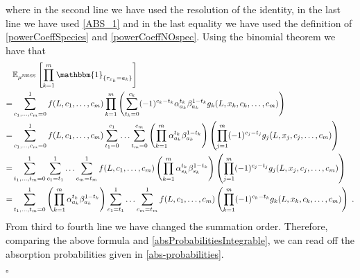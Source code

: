 \documentclass[10pt]{article}
\numberwithin{equation}{section}
\numberwithin{equation}{subsection}
\newcommand{\dt}{\;.}
\begin{document}
where in the second line we have used the resolution of the identity, in the last line we have used \eqref{ABS_1} and in the last equality we have used the definition of \eqref{powerCoeffSpecies} and \eqref{powerCoeffNOspec}.  
Using the binomial theorem we have that 
\begin{align}
	&\mathbb{E}_{\mu^{\text{NESS}}}\left[\prod_{k=1}^{m}\mathbbm{1}_{\{\tau_{x_{k}}=a_{k}\}}\right]\\=&
	\sum_{c_{1},\ldots,c_{m}=0}^{1}
	f(L,c_{1},\ldots,c_{m})\prod_{k=1}^{m}\left(\sum_{t_{k}=0}^{c_{k}}(-1)^{c_{k}-t_{k}}\alpha_{a_{k}}^{t_{k}}\beta_{a_{k}}^{1-t_{k}}g_{k}(L,x_{k},c_{k},\ldots,c_{m})\right)\nonumber\\
	=&\sum_{c_{1},\ldots,c_{m}=0}^{1}
	f(L,c_{1},\ldots,c_{m})\sum_{t_{1}=0}^{c_{1}}\ldots\sum_{t_{m}=0}^{c_{m}}\left(\prod_{k=1}^{m}\alpha_{a_{k}}^{t_{k}}\beta_{a_{k}}^{1-t_{k}}\right)\left(\prod_{j=1}^{m}(-1)^{c_{j}-t_{j}}g_{j}(L,x_{j},c_{j},\ldots,c_{m})\right)\nonumber\\
	=&\sum_{t_{1},\ldots,t_{m}=0}^{1}
	\sum_{c_{1}=t_{1}}^{1}\ldots\sum_{c_{m}=t_{m}}^{1}f(L,c_{1},\ldots,c_{m})\left(\prod_{k=1}^{m}\alpha_{s_{k}}^{t_{k}}\beta_{s_{k}}^{1-t_{k}}\right)\left(\prod_{j=1}^{m}(-1)^{c_{j}-t_{j}}g_{j}(L,x_{j},c_{j},\ldots,c_{m})\right)\nonumber\\
	=&\sum_{t_{1},\ldots,t_{m}=0}^{1}\left(\prod_{k=1}^{m}\alpha_{a_{k}}^{t_{k}}\beta_{a_{k}}^{1-t_{k}}\right)\sum_{c_{1}=t_{1}}^{1}\ldots\sum_{c_{m}=t_{m}}^{1}f(L,c_{1},\ldots,c_{m})\left(\prod_{k=1}^{m}(-1)^{c_{k}-t_{k}}g_{k}(L,x_{k},c_{k},\ldots,c_{m})\right)\dt
\end{align}
From third to fourth line we have changed the summation order. Therefore, comparing the above formula and \eqref{absProbabilitiesIntegrable}, we can read off the absorption probabilities given in \eqref{abs-probabilities}.
\begin{flushright}
	$\square$
\end{flushright}
\end{document}
